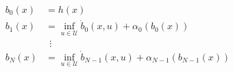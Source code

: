 \documentclass[preview]{standalone}
\begin{document}
\begin{align*}
b_0(x) &= h(x)\\ b_1(x) &= \inf_{u \in \mathcal{U}} \dot b_0(x, u) + \alpha_0 (b_0(x))\\ &\ \ \vdots\\ b_N(x) &= \inf_{u \in \mathcal{U}} \dot b_{N-1}(x, u) + \alpha_{N-1} (b_{N-1}(x))
\end{align*}
\end{document}
